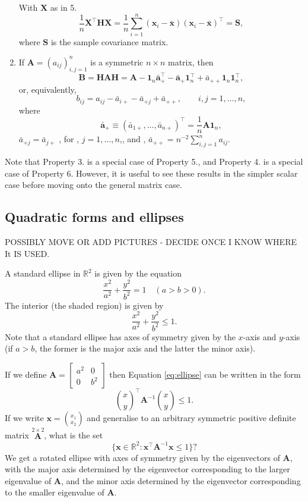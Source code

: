 \documentclass[]{book}
\theoremstyle{definition}
\theoremstyle{definition}
\theoremstyle{definition}
\theoremstyle{remark}
\begin{document}
\begin{enumerate}
  With \(\boldsymbol X\) as in 5.
  \[
  \frac{1}{n}\boldsymbol X^\top \boldsymbol H\boldsymbol X=\frac{1}{n} \sum_{i=1}^n (\boldsymbol x_i -\bar{\boldsymbol x})(\boldsymbol x_i -\bar{\boldsymbol x})^\top =\boldsymbol S,
  \]
  where \(\boldsymbol S\) is the sample covariance matrix.
\item
  If \(\boldsymbol A=(a_{ij})_{i,j=1}^n\) is a symmetric \(n \times n\) matrix, then
  \[
  \boldsymbol B=\boldsymbol H\boldsymbol A\boldsymbol H= \boldsymbol A- {\mathbf 1}_n \bar{\boldsymbol a}_+^\top -\bar{\boldsymbol a}_+{\mathbf 1}_n^\top +\bar{a}_{++}{\mathbf 1}_n {\mathbf 1}_n^\top,
  \]
  or, equivalently,
  \[
  b_{ij}=a_{ij}-\bar{a}_{i+}-\bar{a}_{+j}+\bar{a}_{++}, \qquad i,j=1, \ldots , n,
  \]
  where
  \[
  \bar{\boldsymbol a}_{+}\equiv (\bar{a}_{1+}, \ldots , \bar{a}_{n+})^\top=\frac{1}{n}\boldsymbol A{\mathbf 1}_n,
  \]
  \(\bar{a}_{+j}=\bar{a}_{j+}\) , for , \(j=1, \ldots , n\),, and , \(\bar{a}_{++}=n^{-2}\sum_{i,j=1}^n a_{ij}\).
\end{enumerate}

Note that Property 3. is a special case of Property 5., and Property 4. is a special case of Property 6.
However, it is useful to see these results in the simpler scalar case before moving onto the general matrix case.

\hypertarget{quadratic-forms-and-ellipses}{%
\subsection{Quadratic forms and ellipses}\label{quadratic-forms-and-ellipses}}

POSSIBLY MOVE OR ADD PICTURES - DECIDE ONCE I KNOW WHERE It IS USED.

A standard ellipse in \(\mathbb{R}^2\) is given by the equation
\[
\frac{x^2}{a^2}+\frac{y^2}{b^2}=1 \quad (a>b>0).
\]
The interior (the shaded region) is given by
\begin{equation}
\frac{x^2}{a^2}+\frac{y^2}{b^2}\leq 1.   \label{eq:ellipse}
\end{equation}
Note that a standard ellipse has axes of symmetry given by the \(x\)-axis and \(y\)-axis
(if \(a>b\), the former is the major axis and the latter the minor axis).

If we define
\({\mathbf A}=\left[ \begin{array}{cc} a^2&0\\ 0&b^2 \end{array} \right]\)
then Equation \eqref{eq:ellipse} can be written in the form
\[ \binom{x}{y}^\top {\mathbf A}^{-1} \binom{x}{y}\leq 1. \]
If we write \({\mathbf x}=\binom{x_1}{x_2}\) and generalise to an arbitrary symmetric
positive definite matrix \(\stackrel{2 \times 2}{\mathbf A}\), what is the set
\[ \{ {\mathbf x} \in \mathbb{R}^2 : {\mathbf x}^\top {\mathbf A}^{-1} {\mathbf x} \leq 1\} ? \]
We get a rotated ellipse with axes of symmetry given by the eigenvectors of \(\mathbf A\),
with the major axis determined by the eigenvector corresponding to the larger
eigenvalue of \(\mathbf A\), and the minor axis determined by the eigenvector corresponding
to the smaller eigenvalue of \(\mathbf A\).
\end{document}
